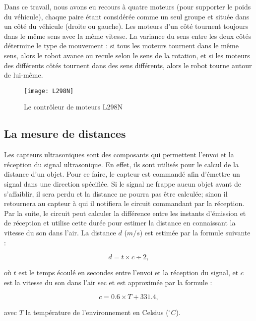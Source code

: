 Dans ce travail, nous avons eu recours à quatre moteurs
(pour supporter le poids du véhicule), chaque paire étant considérée comme un
seul groupe et située dans un côté du véhicule (droite ou gauche).
Les moteurs d'un côté tournent toujours dans le même sens avec la même vitesse.
La variance du sens entre les deux côtés détermine le type de mouvement : si
tous les moteurs tournent dans le même sens, alors le robot avance ou recule
selon le sens de la rotation, et si les moteurs des différents côtés tournent dans
des sens différents, alors le robot tourne autour de lui-même.

\begin{figure}[h]
\begin{center}
\texttt{[image: L298N]}
\caption{Le contrôleur de moteurs L298N}
\end{center}
\end{figure}

\subsection{La mesure de distances}

Les capteurs ultrasoniques sont des composants qui permettent l'envoi et la
réception du signal ultrasonique. En effet, ils sont utilisés pour le calcul
de la distance d'un objet. Pour ce faire, le capteur est commandé afin d'émettre
un signal dans une direction spécifiée. Si le signal ne frappe aucun objet avant de
s'affaiblir, il sera perdu et la distance ne pourra pas être calculée; sinon il
retournera au capteur à qui il notifiera le circuit commandant par la réception.
Par la suite, le circuit peut calculer la différence entre les instants d'émission
et de réception et utilise cette durée pour estimer la distance en connaissant
la vitesse du son dans l'air. La distance $d$ ($m/s$) est estimée par la formule suivante :

\begin{equation}
  d = t \times c \div 2,
\end{equation}

où $t$ est le temps écoulé en secondes entre l'envoi et la réception du signal,
et $c$ est la vitesse du son dans l'air sec et est approximée par la formule :

\begin{equation}
  c = 0.6 \times T + 331.4,
\end{equation}

avec $T$ la température de l'environnement en Celsius ($ ^\circ C$).


